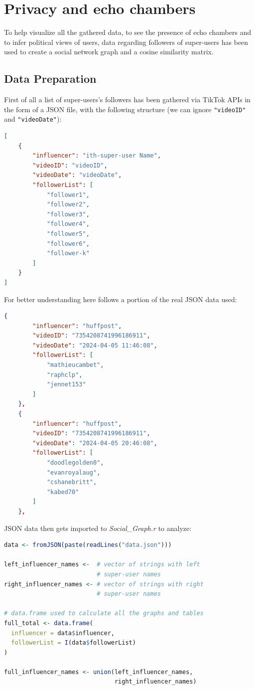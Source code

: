 \section{Privacy and echo chambers}
To help visualize all the gathered data, to see the presence of echo chambers and to infer political views of users, data regarding followers of super-users has been used to create a social network graph and a cosine similarity matrix.

\subsection{Data Preparation}
First of all a list of super-users's followers has been gathered via TikTok APIs in the form of a JSON file, with the following structure (we can ignore \verb+"videoID"+ and \verb+"videoDate"+):

\begin{lstlisting}[language=json]
[
    {
        "influencer": "ith-super-user Name",
        "videoID": "videoID",
        "videoDate": "videoDate",
        "followerList": [
            "follower1",
            "follower2",
            "follower3",
            "follower4",
            "follower5",
            "follower6",
            "follower-k"
        ]
    }
]
\end{lstlisting}

For better understanding here follows a portion of the real JSON data used:

\begin{lstlisting}[language=json]
    {
        "influencer": "huffpost",
        "videoID": "7354208741996186911",
        "videoDate": "2024-04-05 11:46:08",
        "followerList": [
            "mathieucambet",
            "raphclp",
            "jennet153"
        ]
    },
    {
        "influencer": "huffpost",
        "videoID": "7354208741996186911",
        "videoDate": "2024-04-05 20:46:08",
        "followerList": [
            "doodlegolden0",
            "evanroyalaug",
            "cshanebritt",
            "kabed70"
        ]
    },
\end{lstlisting}

JSON data then gets imported to \textit{Social\_Graph.r} to analyze:

\begin{lstlisting}[language=R]
data <- fromJSON(paste(readLines("data.json")))

left_influencer_names <-  # vector of strings with left 
                          # super-user names
right_influencer_names <- # vector of strings with right 
                          # super-user names

# data.frame used to calculate all the graphs and tables
full_total <- data.frame(
  influencer = data$influencer,
  followerList = I(data$followerList)
)

full_influencer_names <- union(left_influencer_names, 
                               right_influencer_names)
\end{lstlisting}


